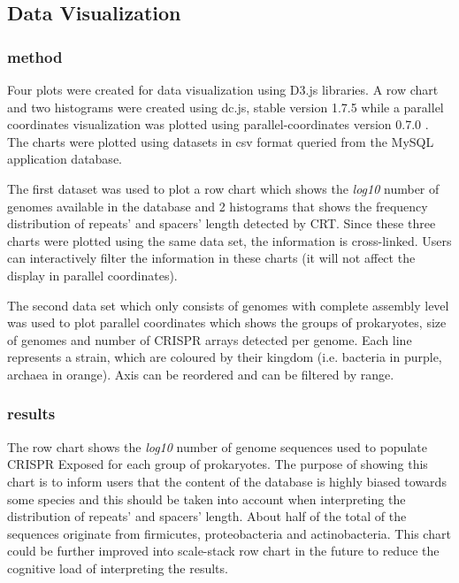 \documentclass[11pt, a4paper,titlepage]{article}
\begin{document}
\subsection{Data Visualization}

\subsubsection{method}

Four plots were created for data visualization using D3.js
libraries. A row chart and two histograms were created using dc.js,
stable version 1.7.5 \cite{DcJs} while a parallel coordinates
visualization was plotted using parallel-coordinates version 0.7.0
\cite{ParCoordJs}. The charts were plotted using datasets in csv
format queried from the MySQL application database.

The first dataset was used to plot a row chart which shows the
\emph{log10} number of genomes available in the database and 2
histograms that shows the frequency distribution of repeats’ and
spacers’ length detected by CRT. Since these three charts were plotted
using the same data set, the information is cross-linked. Users can
interactively filter the information in these charts (it will not
affect the display in parallel coordinates).

The second data set which only consists of genomes with complete
assembly level was used to plot parallel coordinates which shows the
groups of prokaryotes, size of genomes and number of CRISPR arrays
detected per genome. Each line represents a strain, which are coloured
by their kingdom (i.e. bacteria in purple, archaea in orange). Axis
can be reordered and can be filtered by range.

\subsubsection{results}

The row chart shows the \emph{log10} number of genome sequences used
to populate CRISPR Exposed for each group of prokaryotes. The purpose
of showing this chart is to inform users that the content of the
database is highly biased towards some species and this should be
taken into account when interpreting the distribution of repeats’ and
spacers’ length. About half of the total of the sequences originate
from firmicutes, proteobacteria and actinobacteria. This chart could
be further improved into scale-stack row chart in the future to reduce
the cognitive load of interpreting the results.
\end{document}
